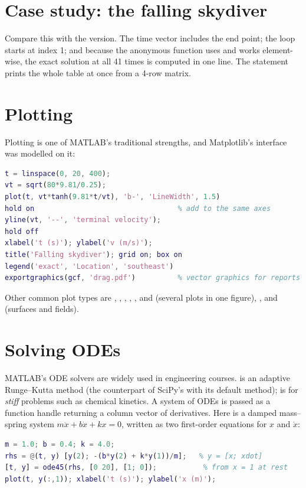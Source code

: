 \section{Case study: the falling skydiver}

Compare this with the \py version. The time vector  includes the end
point; the loop starts at index 1; and because the anonymous function 
uses  and works element-wise, the exact solution at all 41 times is computed in
one line. The  statement prints the whole table at once from a 4-row matrix.

\section{Plotting}

Plotting is one of MATLAB's traditional strengths, and Matplotlib's interface was modelled
on it:
\begin{lstlisting}[language=Matlab]
t = linspace(0, 20, 400);
vt = sqrt(80*9.81/0.25);
plot(t, vt*tanh(9.81*t/vt), 'b-', 'LineWidth', 1.5)
hold on                                  % add to the same axes
yline(vt, '--', 'terminal velocity');
hold off
xlabel('t (s)'); ylabel('v (m/s)');
title('Falling skydiver'); grid on; box on
legend('exact', 'Location', 'southeast')
exportgraphics(gcf, 'drag.pdf')          % vector graphics for reports
\end{lstlisting}
Other common plot types are , , , ,
,  and  (several plots in one figure),
,  and  (surfaces and fields).

\section{Solving ODEs}

MATLAB's ODE solvers are widely used in engineering courses.  is an adaptive
Runge--Kutta method (the counterpart of SciPy's  with its default
method);  is for \emph{stiff} problems such as chemical kinetics. A system of
ODEs is passed as a function handle returning a column vector of derivatives. Here is a
damped mass--spring system $m\ddot x + b\dot x + kx = 0$, written as two first-order
equations for $x$ and $\dot x$:
\begin{lstlisting}[language=Matlab]
m = 1.0; b = 0.4; k = 4.0;
rhs = @(t, y) [y(2); -(b*y(2) + k*y(1))/m];   % y = [x; xdot]
[t, y] = ode45(rhs, [0 20], [1; 0]);           % from x = 1 at rest
plot(t, y(:,1)); xlabel('t (s)'); ylabel('x (m)');
\end{lstlisting}

